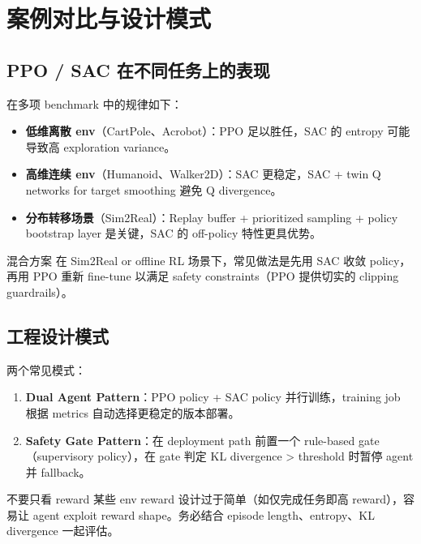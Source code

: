 \documentclass[a4paper]{article}
\begin{document}
\section{案例对比与设计模式}

\subsection{PPO / SAC 在不同任务上的表现}

在多项 benchmark 中的规律如下：

\begin{itemize}
    \item \textbf{低维离散 env}（CartPole、Acrobot）：PPO 足以胜任，SAC 的 entropy 可能导致高 exploration variance。
    \item \textbf{高维连续 env}（Humanoid、Walker2D）：SAC 更稳定，SAC + twin Q networks for target smoothing 避免 Q divergence。
    \item \textbf{分布转移场景}（Sim2Real）：Replay buffer + prioritized sampling + policy bootstrap layer 是关键，SAC 的 off-policy 特性更具优势。
\end{itemize}

\begin{importantbox}{混合方案}
在 Sim2Real or offline RL 场景下，常见做法是先用 SAC 收敛 policy，再用 PPO 重新 fine-tune 以满足 safety constraints（PPO 提供切实的 clipping guardrails）。
\end{importantbox}

\subsection{工程设计模式}

两个常见模式：

\begin{enumerate}
    \item \textbf{Dual Agent Pattern}：PPO policy + SAC policy 并行训练，training job 根据 metrics 自动选择更稳定的版本部署。
    \item \textbf{Safety Gate Pattern}：在 deployment path 前置一个 rule-based gate（supervisory policy），在 gate 判定 KL divergence > threshold 时暂停 agent 并 fallback。
\end{enumerate}

\begin{warningbox}{不要只看 reward}
某些 env reward 设计过于简单（如仅完成任务即高 reward），容易让 agent exploit reward shape。务必结合 episode length、entropy、KL divergence 一起评估。
\end{warningbox}
\end{document}
